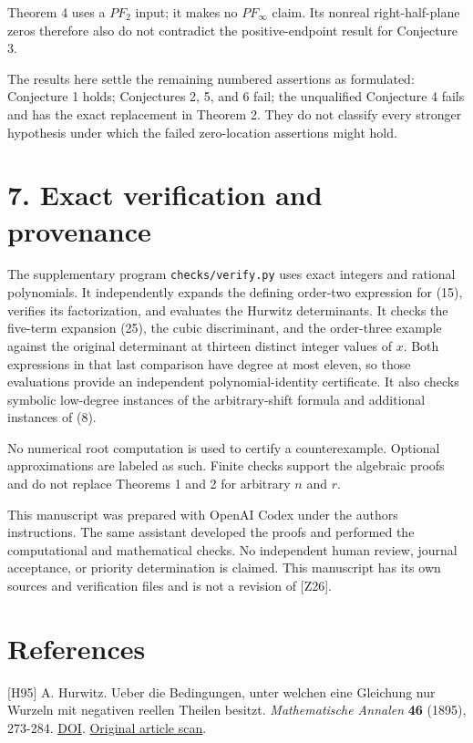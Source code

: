 \documentclass[11pt]{article}
\begin{document}
Theorem 4 uses a \(PF_2\) input; it makes no \(PF_\infty\) claim. Its
nonreal right-half-plane zeros therefore also do not contradict the
positive-endpoint result for Conjecture 3.

The results here settle the remaining numbered assertions as formulated:
Conjecture 1 holds; Conjectures 2, 5, and 6 fail; the unqualified
Conjecture 4 fails and has the exact replacement in Theorem 2. They do
not classify every stronger hypothesis under which the failed
zero-location assertions might hold.

\section{7. Exact verification and
provenance}\label{exact-verification-and-provenance}

The supplementary program \texttt{checks/verify.py} uses exact integers
and rational polynomials. It independently expands the defining
order-two expression for (15), verifies its factorization, and evaluates
the Hurwitz determinants. It checks the five-term expansion (25), the
cubic discriminant, and the order-three example against the original
determinant at thirteen distinct integer values of \(x\). Both
expressions in that last comparison have degree at most eleven, so those
evaluations provide an independent polynomial-identity certificate. It
also checks symbolic low-degree instances of the arbitrary-shift formula
and additional instances of (8).

No numerical root computation is used to certify a counterexample.
Optional approximations are labeled as such. Finite checks support the
algebraic proofs and do not replace Theorems 1 and 2 for arbitrary \(n\)
and \(r\).

This manuscript was prepared with OpenAI Codex under the
author\textquotesingle s instructions. The same assistant developed the
proofs and performed the computational and mathematical checks. No
independent human review, journal acceptance, or priority determination
is claimed. This manuscript has its own sources and verification files
and is not a revision of {[}Z26{]}.

\section{References}\label{references}

{[}H95{]} A. Hurwitz. Ueber die Bedingungen, unter welchen eine
Gleichung nur Wurzeln mit negativen reellen Theilen besitzt.
\emph{Mathematische Annalen} \textbf{46} (1895), 273-284.
\href{https://doi.org/10.1007/BF01446812}{DOI}.
\href{https://gdz.sub.uni-goettingen.de/download/pdf/PPN235181684_0046/LOG_0026.pdf}{Original
article scan}.
\end{document}
